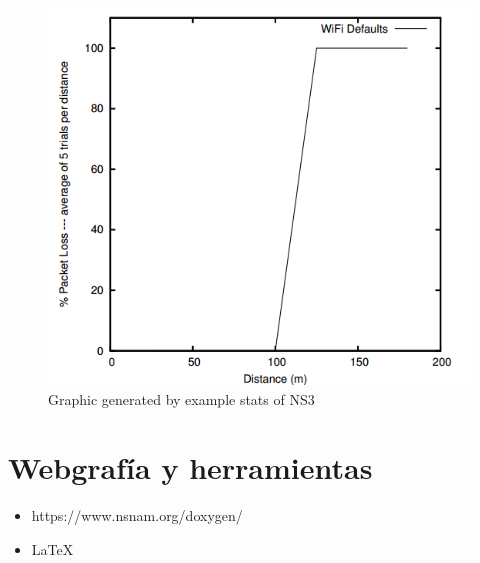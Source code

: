 \documentclass[a4paper,10pt]{article}
\begin{document}
\begin{figure}[h]
        	\centering
    \includegraphics[scale=0.55]{basegraph.png}
    \caption{Graphic generated by example stats of NS3}
    \label{fig:inicio}
        \end{figure}


\pagebreak

\section{Webgraf\'ia y herramientas}
\begin{itemize}
\item https://www.nsnam.org/doxygen/
\item \LaTeX
\end{itemize}
\end{document}
